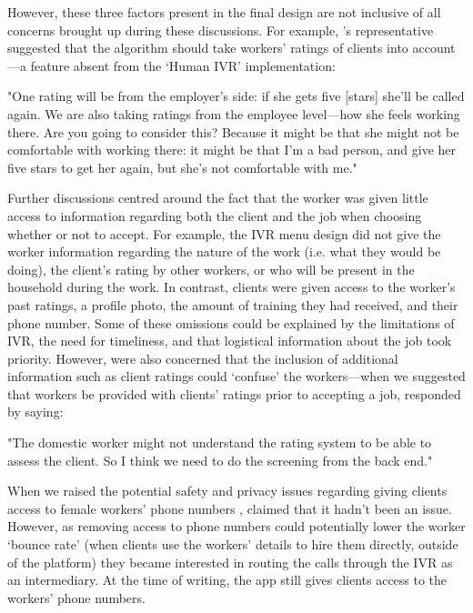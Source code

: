 However, these three factors present in the final design are not inclusive of all concerns brought up during these discussions. For example, \NGO{}'s representative suggested that the algorithm should take workers' ratings of clients into account---a feature absent from the `Human IVR' implementation:

\begin{displayquote}
"One rating will be from the employer’s side: if she gets five [stars] she’ll be called again. We are also taking ratings from the employee level---how she feels working there. Are you going to consider this? Because it might be that she might not be comfortable with working there: it might be that I’m a bad person, and give her five stars to get her again, but she’s not comfortable with me."
\end{displayquote}

Further discussions centred around the fact that the worker was given little access to information regarding both the client and the job when choosing whether or not to accept. For example, the IVR menu design did not give the worker information regarding the nature of the work (i.e. what they would be doing), the client's rating by other workers, or who will be present in the household during the work. In contrast, clients were given access to the worker's past ratings, a profile photo, the amount of training they had received, and their phone number. Some of these omissions could be explained by the limitations of IVR, the need for timeliness, and that logistical information about the job took priority. However, \PC{} were also concerned that the inclusion of additional information such as client ratings could `confuse' the workers---when we suggested that workers be provided with clients' ratings prior to accepting a job, \PC{} responded by saying:

\begin{displayquote}
"The domestic worker might not understand the rating system to be able to assess the client. So I think we need to do the screening from the back end."
\end{displayquote}

When we raised the potential safety and privacy issues regarding giving clients access to female workers' phone numbers \cite{Sambasivan2019}, \PC{} claimed that it hadn't been an issue. However, as removing access to phone numbers could potentially lower the worker `bounce rate' (when clients use the workers' details to hire them directly, outside of the \PC{} platform) they became interested in routing the calls through the IVR as an intermediary. At the time of writing, the \PC{} app still gives clients access to the workers' phone numbers. 

